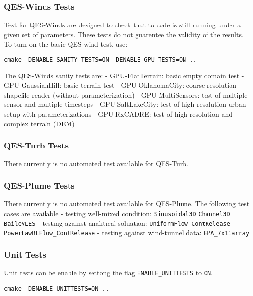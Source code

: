 \subsubsection{QES-Winds Tests}

Test for QES-Winds are designed to check that to code is still running under a given set of parameters. These tests do not guarentee the validity of the results. To turn on the basic QES-wind test, use:
\begin{verbatim}
cmake -DENABLE_SANITY_TESTS=ON -DENABLE_GPU_TESTS=ON ..
\end{verbatim}
The QES-Winds sanity tests are:
- GPU-FlatTerrain: basic empty domain test
- GPU-GaussianHill: basic terrain test
- GPU-OklahomaCity: coarse resolution shapefile reader (without parameterization)
- GPU-MultiSensors: test of multiple sensor and multiple timesteps
- GPU-SaltLakeCity: test of high resolution urban setup with parameterizations
- GPU-RxCADRE: test of high resolution and complex terrain (DEM)

\subsubsection{QES-Turb Tests}

There currently is no automated test available for QES-Turb.

\subsubsection{QES-Plume Tests}

There currently is no automated test available for QES-Plume. The following test cases are available
- testing well-mixed condition: \verb|Sinusoidal3D| \verb|Channel3D| \verb|BaileyLES|
- testing against analitical soluation: \verb|UniformFlow_ContRelease| \verb|PowerLawBLFlow_ContRelease|
- testing against wind-tunnel data: \verb|EPA_7x11array|

\subsubsection{Unit Tests}
Unit tests can be enable by settong the flag \verb|ENABLE_UNITTESTS| to \verb|ON|.
\begin{verbatim}
cmake -DENABLE_UNITTESTS=ON ..
\end{verbatim}
